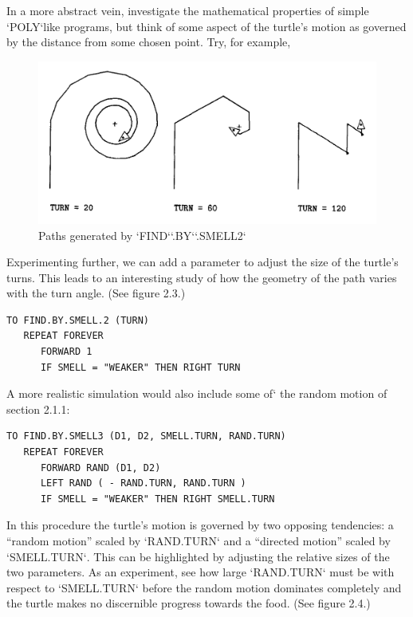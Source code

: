 \documentclass{book}
\begin{document}
In a more abstract vein, investigate the mathematical properties of
simple \textsc{`POLY`}like programs, but think of some aspect of the turtle's motion
as governed by the distance from some chosen point. Try, for example,

\begin{figure}
\begin{center}
\includegraphics[scale=1]{fig2-3}
\caption{Paths generated by \textsc{`FIND`}\textsc{`.BY`}\textsc{`.SMELL2`}}
\end{center}
\end{figure}

Experimenting further, we can add a parameter to adjust the size of the
turtle's turns. This leads to an interesting study of how the geometry
of the path varies with the turn angle. (See figure 2.3.)

\begin{verbatim}
TO FIND.BY.SMELL.2 (TURN)
   REPEAT FOREVER
      FORWARD 1
      IF SMELL = "WEAKER" THEN RIGHT TURN
\end{verbatim}
A more realistic simulation would also include some of` the random
motion of section 2.1.1:

\begin{verbatim}
TO FIND.BY.SMELL3 (D1, D2, SMELL.TURN, RAND.TURN)
   REPEAT FOREVER
      FORWARD RAND (D1, D2)
      LEFT RAND ( - RAND.TURN, RAND.TURN )
      IF SMELL = "WEAKER" THEN RIGHT SMELL.TURN
\end{verbatim}
In this procedure the turtle's motion is governed by two opposing tendencies: a ``random motion'' scaled by \textsc{`RAND.TURN`} and a ``directed motion'' scaled by \textsc{`SMELL.TURN`}. This can be highlighted by adjusting the
relative sizes of the two parameters. As an experiment, see how large
\textsc{`RAND.TURN`} must be with respect to \textsc{`SMELL.TURN`} before the random motion dominates completely and the turtle makes no discernible progress
towards the food. (See figure 2.4.)
\end{document}
